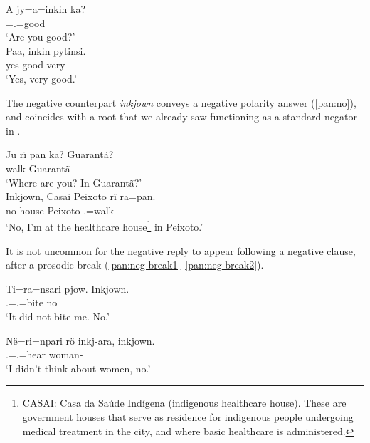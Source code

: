 \documentclass[output=paper,colorlinks,citecolor=brown,draft]{langscibook}
\begin{document}
\ea\label{pan:paa}
    \begin{xlist}[Q: ]
       \gll A jy=a=inkin ka? \\
       \Q{} \Intr{}=\Ssg.\Abs{}=good \Ssg{}\\
       \glt `Are you good?'\\
    \label{pan:paab}
        \gll Paa, inkin pytinsi.\\
        yes good very  \\
        \glt `Yes, very good.'\\
    \end{xlist}
\z

The negative counterpart \textit{inkjown} conveys a negative polarity answer (\ref{pan:no}), and coincides with a root that we already saw functioning as a standard negator in .

\ea\label{pan:no}
    \begin{xlist}[Q: ]
       \gll Ju rï pan ka? Guarantã?\\
        \Q{} \Loc{} walk \Ssg{} Guarantã \\
        \glt `Where are you? In Guarantã?'  \\
        \gll Inkjown, Casai Peixoto rï ra=pan.\\
         no house Peixoto \Loc{} \Fsg.\Abs{}=walk \\
        \glt `No, I'm at the healthcare house\footnote{CASAI: Casa da Saúde Indígena (indigenous healthcare house). These are government houses that serve as residence for indigenous people undergoing medical treatment in the city, and where basic healthcare is administered.} in Peixoto.'  \\
    \end{xlist}
\z

It is not uncommon for the negative reply to appear following a negative clause, after a prosodic break (\ref{pan:neg-break1}--\ref{pan:neg-break2}).

\ea\label{pan:neg-break1}
    \gll Ti=ra=nsari pjow. Inkjown. \\
    \Tsg.\Erg{}=\Fsg.\Abs{}=bite \Neg{} no \\
    \glt `It did not bite me. No.' \\
\z

\ea\label{pan:neg-break2}
    \gll Në=ri=npari rö inkj-ara, inkjown. \\
    \Fsg.\Erg{}=\Tpl.\Abs{}=hear \Neg{} woman-\Pl{} \Neg{} \\
    \glt `I didn't think about women, no.' \\
\z
\end{document}
